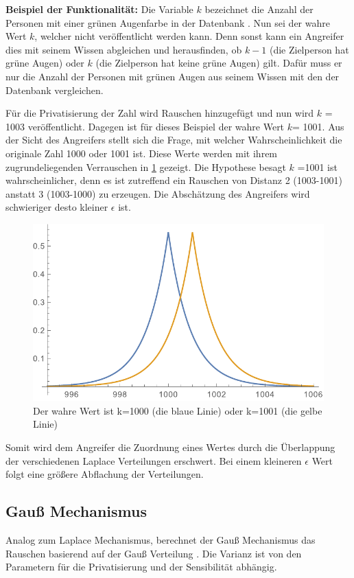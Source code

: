 \textbf{Beispiel der Funktionalität: }
Die Variable $k$ bezeichnet die Anzahl der Personen mit einer grünen Augenfarbe in der Datenbank \parencite{DPEasy2018}. Nun sei der wahre Wert $k$, welcher nicht veröffentlicht werden kann. Denn sonst kann ein Angreifer dies mit seinem Wissen abgleichen und herausfinden, ob $k-1$ (die Zielperson hat grüne Augen) oder $k$ (die Zielperson hat keine grüne Augen) gilt. Dafür muss er nur die Anzahl der Personen mit grünen Augen aus seinem Wissen mit den der Datenbank vergleichen. 

Für die Privatisierung der Zahl wird Rauschen hinzugefügt und nun wird $k$ = 1003 veröffentlicht. Dagegen ist für dieses Beispiel der wahre Wert $k$= 1001.
Aus der Sicht des Angreifers stellt sich die Frage, mit welcher Wahrscheinlichkeit die originale Zahl 1000 oder 1001 ist. Diese Werte werden mit ihrem zugrundeliegenden Verrauschen in \cref{fig:k_value} gezeigt. Die Hypothese besagt $k$ =1001 ist wahrscheinlicher, denn es ist zutreffend ein Rauschen von Distanz 2 (1003-1001) anstatt 3 (1003-1000) zu erzeugen. Die Abschätzung des Angreifers wird schwieriger desto kleiner $\epsilon$ ist.

\begin{figure}[htbp]
	\centering
	\includegraphics[scale=0.7]{./images/k_laplace_small_eps.pdf}
	\caption{Der wahre Wert ist k=1000 (die blaue Linie) oder k=1001 (die gelbe Linie) \parencite{DPEasy2018}}
	\label{fig:k_value}
\end{figure}

Somit wird dem Angreifer die Zuordnung eines Wertes durch die Überlappung der verschiedenen Laplace Verteilungen erschwert. Bei einem kleineren $\epsilon$ Wert folgt eine größere Abflachung der Verteilungen. 


\subsection{Gauß Mechanismus}
Analog zum Laplace Mechanismus, berechnet der Gauß Mechanismus das Rauschen basierend auf der Gauß Verteilung \parencite{AlgoFoundations2014}. Die Varianz ist von den Parametern für die Privatisierung und der Sensibilität abhängig.

